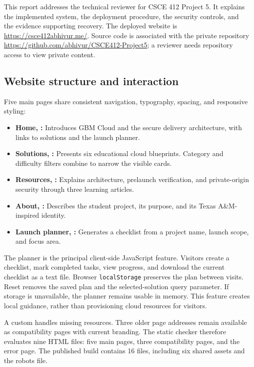 \documentclass[11pt]{article}
\begin{document}
This report addresses the technical reviewer for CSCE 412 Project 5. It explains the implemented system, the deployment procedure, the security controls, and the evidence supporting recovery. The deployed website is \url{https://csce412abhivur.me/}. Source code is associated with the private repository \url{https://github.com/abhivur/CSCE412-Project5}; a reviewer needs repository access to view private content.

\subsection{Website structure and interaction}
Five main pages share consistent navigation, typography, spacing, and responsive styling:
\begin{itemize}
  \item \textbf{Home, :} Introduces GBM Cloud and the secure delivery architecture, with links to solutions and the launch planner.
  \item \textbf{Solutions, :} Presents six educational cloud blueprints. Category and difficulty filters combine to narrow the visible cards.
  \item \textbf{Resources, :} Explains architecture, prelaunch verification, and private-origin security through three learning articles.
  \item \textbf{About, :} Describes the student project, its purpose, and its Texas A\&M-inspired identity.
  \item \textbf{Launch planner, :} Generates a checklist from a project name, launch scope, and focus area.
\end{itemize}
The planner is the principal client-side JavaScript feature. Visitors create a checklist, mark completed tasks, view progress, and download the current checklist as a text file. Browser \texttt{localStorage} preserves the plan between visits. Reset removes the saved plan and the selected-solution query parameter. If storage is unavailable, the planner remains usable in memory. This feature creates local guidance, rather than provisioning cloud resources for visitors.

A custom  handles missing resources. Three older page addresses remain available as compatibility pages with current branding. The static checker therefore evaluates nine HTML files: five main pages, three compatibility pages, and the error page. The published build contains 16 files, including six shared assets and the robots file.
\end{document}
